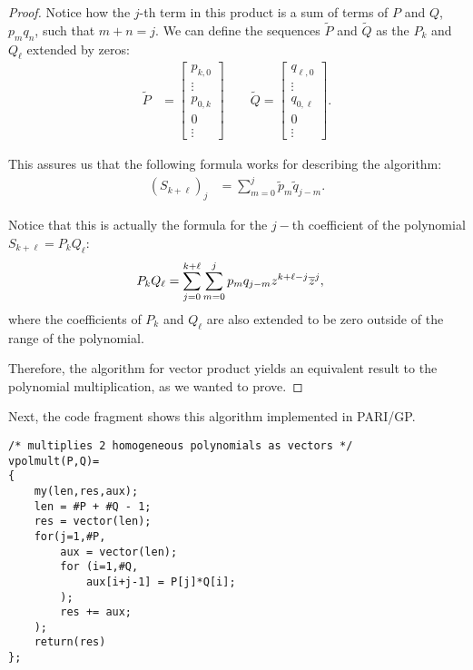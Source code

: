 \begin{proposition}
\begin{proof}
Notice how the $j$-th term in this product is a sum of terms of $P$ and $Q$, $p_mq_n$, such that $m+n=j$. We can define the sequences $\tilde P$ and $\tilde Q$ as the $P_k$ and $Q_{\ell}$ extended by zeros:
\begin{align*}
\tilde P &= 
\begin{bmatrix}
p_{k,0}\\
\vdots\\
p_{0,k}\\
0\\
\vdots
\end{bmatrix}
\qquad
\tilde Q =
\begin{bmatrix}
q_{\ell,0}\\
\vdots\\
q_{0,\ell}\\
0\\
\vdots
\end{bmatrix}.
\end{align*}

This assures us that the following formula works for describing the algorithm:
\begin{align*}
(S_{k+\ell})_j &= \sum_{m=0}^j \tilde p_m \tilde q_{j-m}.
\end{align*}

Notice that this is actually the formula for the $j-$th coefficient of the polynomial $S_{k+\ell}=P_kQ_{\ell}$:
\begin{align*}
P_kQ_{\ell} &= \sum_{j=0}^{k+\ell} \sum_{m=0}^j p_mq_{j-m}z^{k+\ell-j}\overline{z}^j,
\end{align*}
where the coefficients of $P_k$ and $Q_{\ell}$ are also extended to be zero outside of the range of the polynomial.

Therefore, the algorithm for vector product yields an equivalent result to the polynomial multiplication, as we wanted to prove.
\end{proof}
\end{proposition}

Next, the code fragment shows this algorithm implemented in PARI/GP.
\begin{center}
\begin{minipage}{0.8\textwidth}
\begin{lstlisting}[caption={Vectorised polynomial product in PARI/GP.}]
/* multiplies 2 homogeneous polynomials as vectors */
vpolmult(P,Q)=
{
    my(len,res,aux);
    len = #P + #Q - 1;
    res = vector(len);
    for(j=1,#P,
        aux = vector(len);
        for (i=1,#Q,
            aux[i+j-1] = P[j]*Q[i];
        );
        res += aux;
    );
    return(res)
};
\end{lstlisting}
\end{minipage}
\end{center}




